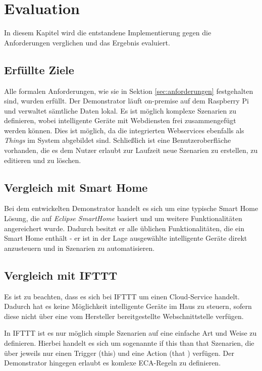 \chapter{Evaluation}
\label{chap:eval}
In diesem Kapitel wird die entstandene Implementierung gegen die Anforderungen verglichen und das Ergebnis evaluiert.

\section{Erfüllte Ziele}
Alle formalen Anforderungen, wie sie in Sektion \ref{sec:anforderungen} festgehalten sind, wurden erfüllt. Der Demonstrator läuft on-premise auf dem Raspberry Pi und verwaltet sämtliche Daten lokal. Es ist möglich komplexe Szenarien zu definieren, wobei intelligente Geräte mit Webdiensten frei zusammengefügt werden können. Dies ist möglich, da die integrierten Webservices ebenfalls als \textit{Things} im System abgebildet sind. Schließlich ist eine Benutzeroberfläche vorhanden, die es dem Nutzer erlaubt zur Laufzeit neue Szenarien zu erstellen, zu editieren und zu löschen.

\section{Vergleich mit Smart Home}
Bei dem entwickelten Demonstrator handelt es sich um eine typische Smart Home Lösung, die auf \textit{Eclipse SmartHome} basiert und um weitere Funktionalitäten angereichert wurde. Dadurch besitzt er alle üblichen Funktionalitäten, die ein Smart Home enthält - er ist in der Lage ausgewählte intelligente Geräte direkt anzusteuern und in Szenarien zu automatisieren. 

\section{Vergleich mit IFTTT}
Es ist zu beachten, dass es sich bei IFTTT um einen Cloud-Service handelt. Dadurch hat es keine Möglichkeit intelligente Geräte im Haus zu steuern, sofern diese nicht über eine vom Hersteller bereitgestellte Webschnittstelle verfügen.

In IFTTT ist es nur möglich simple Szenarien auf eine einfache Art und Weise zu definieren. Hierbei handelt es sich um sogenannte \glqq if this than that\grqq{} Szenarien, die über jeweils nur einen Trigger (\glqq this\grqq) und eine Action (\glqq that \grqq) verfügen. Der Demonstrator hingegen erlaubt es komlexe ECA-Regeln zu definieren.

